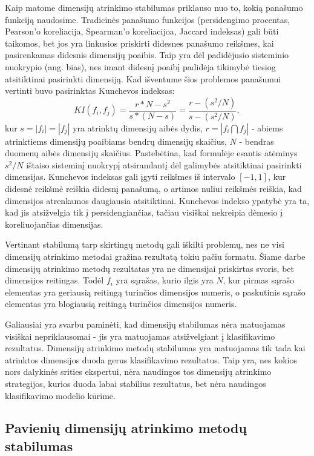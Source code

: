 Kaip matome dimensijų atrinkimo stabilumas priklauso nuo to, kokią panašumo 
funkciją naudosime. Tradicinės panašumo funkcijos (persidengimo procentas, 
Pearson'o koreliacija, Spearman'o koreliacijoa, Jaccard indeksas) 
gali būti taikomos, bet jos yra linkusios priskirti didesnes panašumo
reikšmes, kai pasirenkamas didesnis dimensijų poaibis. Taip yra dėl padidėjusio 
sisteminio nuokrypio (ang. bias), nes imant didesnį poaibį padidėja tikimybė
tiesiog atsitiktinai pasirinkti dimensiją. 
Kad išventume šios problemos panašumui vertinti buvo pasirinktas Kunchevos
\cite{DBLP:conf/aia/Kuncheva07} indeksas:
\begin{equation}
 KI(f_i, f_j)=\frac{r*N - s^2}{s*(N-s)}=\frac{r - (s^2/N)}{s - (s^2/N)},
\end{equation}		
kur $s=|f_i|=|f_j|$ yra atrinktų dimensijų aibės dydis, $r=|f_i \bigcap f_j|$ -
abiems atrinktiems dimensijų poaibiams bendrų dimensijų skaičius, $N$ - bendras
 duomenų aibės
dimensijų skaičius. Pastebėtina, kad formulėje esantis atėminys $s^2/N$ ištaiso 
sisteminį nuokrypį atsirandantį dėl galimybės atsitiktinai pasirinkti dimensijas.
Kunchevos indeksas gali įgyti reikšmes iš intervalo
$[-1, 1]$, kur didesnė reikšmė reiškia didesnį panašumą, o artimos nuliui 
reikšmės reiškia, kad dimensijos atrenkamos daugiausia atsitiktinai. Kunchevos 
indekso ypatybė yra ta, kad jis atsižvelgia tik į
persidengiančias, tačiau visiškai nekreipia dėmesio į koreliuojančias dimensijas.

Vertinant stabilumą tarp skirtingų metodų gali iškilti problemų, nes ne visi 
dimensijų atrinkimo metodai gražina rezultatą tokiu pačiu formatu. Šiame darbe
dimensijų atrinkimo metodų rezultatas yra ne dimensijai priskirtas svoris, bet 
dimensijos reitingas. Todėl $f_i$ yra sąrašas, kurio ilgis yra $N$, kur pirmas
sąrašo elementas yra geriausią reitingą turinčios dimensijos numeris, o 
paskutinis sąrašo elementas yra blogiausią reitingą turinčios dimensijos numeris.

Galiausiai yra svarbu paminėti, kad dimensijų stabilumas nėra matuojamas
visiškai nepriklausomai - jis yra matuojamas atsižvelgiant į klasifikavimo
rezultatus. Dimensijų atrinkimo metodų stabilumas yra matuojamas tik tada
kai atrinktos dimensijos duoda gerus klasifikavimo rezultatus. Taip yra, nes 
kokios nors dalykinės srities ekspertui, nėra naudingos tos dimensijų atrinkimo
strategijos, kurios duoda labai stabilius rezultatus, bet nėra naudingos
klasifikavimo modelio kūrime.

\subsection{Pavienių dimensijų atrinkimo metodų stabilumas}

